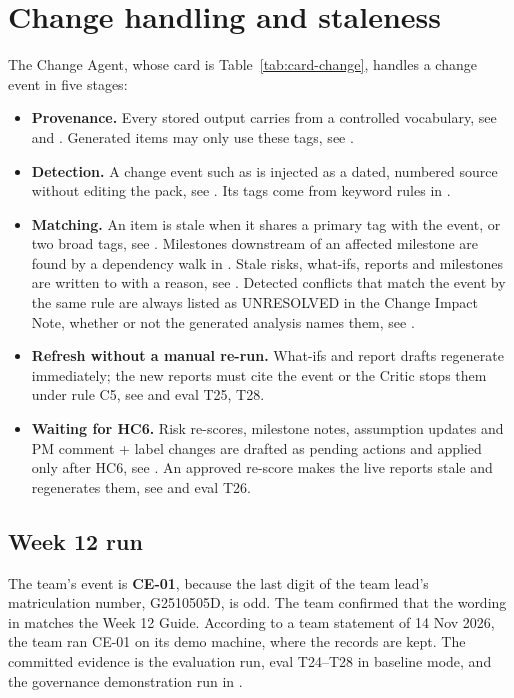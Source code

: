 \chapter{Change handling and staleness}
\label{ch:change}

The Change Agent, whose card is Table~\ref{tab:card-change}, handles a change event in five stages:

\begin{itemize}[leftmargin=*,itemsep=2pt]
  \item \textbf{Provenance.} Every stored output carries  from a controlled vocabulary, see  and . Generated items may only use these tags, see .
  \item \textbf{Detection.} A change event such as  is injected as a dated, numbered source without editing the pack, see . Its tags come from keyword rules in .
  \item \textbf{Matching.} An item is stale when it shares a primary tag with the event, or two broad tags, see . Milestones downstream of an affected milestone are found by a dependency walk in . Stale risks, what-ifs, reports and milestones are written to  with a reason, see . Detected conflicts that match the event by the same rule are always listed as UNRESOLVED in the Change Impact Note, whether or not the generated analysis names them, see .
  \item \textbf{Refresh without a manual re-run.} What-ifs and report drafts regenerate immediately; the new reports must cite the event or the Critic stops them under rule C5, see  and eval T25, T28.
  \item \textbf{Waiting for HC6.} Risk re-scores, milestone notes, assumption updates and PM comment + label changes are drafted as pending actions and applied only after HC6, see . An approved re-score makes the live reports stale and regenerates them, see  and eval T26.
\end{itemize}

\section{Week 12 run}

The team's event is \textbf{CE-01}, because the last digit of the team lead's matriculation number, G2510505D, is odd. The team confirmed that the wording in  matches the Week 12 Guide. According to a team statement of 14 Nov 2026, the team ran CE-01 on its demo machine, where the records are kept. The committed evidence is the evaluation run, eval T24--T28 in baseline mode, and the governance demonstration run in .
